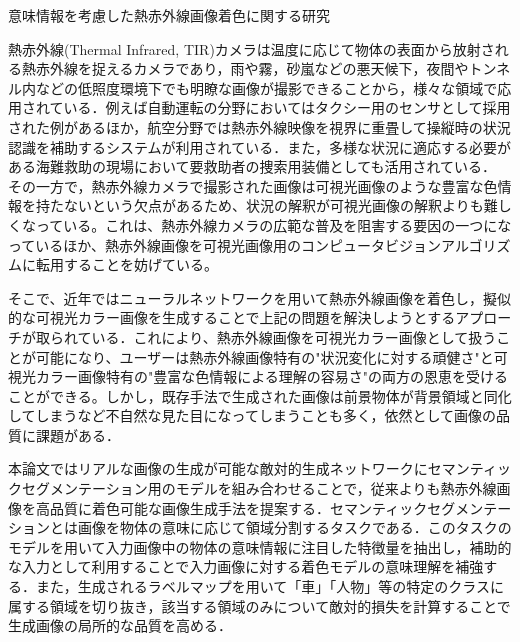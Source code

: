 \thispagestyle{empty}
\begin{center}
    意味情報を考慮した熱赤外線画像着色に関する研究
\end{center}

\thispagestyle{empty}
熱赤外線(Thermal Infrared, TIR)カメラは温度に応じて物体の表面から放射される熱赤外線を捉えるカメラであり，雨や霧，砂嵐などの悪天候下，夜間やトンネル内などの低照度環境下でも明瞭な画像が撮影できることから，様々な領域で応用されている．例えば自動運転の分野においてはタクシー用のセンサとして採用された例があるほか，航空分野では熱赤外線映像を視界に重畳して操縦時の状況認識を補助するシステムが利用されている．また，多様な状況に適応する必要がある海難救助の現場において要救助者の捜索用装備としても活用されている．
その一方で，熱赤外線カメラで撮影された画像は可視光画像のような豊富な色情報を持たないという欠点があるため、状況の解釈が可視光画像の解釈よりも難しくなっている。これは、熱赤外線カメラの広範な普及を阻害する要因の一つになっているほか、熱赤外線画像を可視光画像用のコンピュータビジョンアルゴリズムに転用することを妨げている。


そこで、近年ではニューラルネットワークを用いて熱赤外線画像を着色し，擬似的な可視光カラー画像を生成することで上記の問題を解決しようとするアプローチが取られている．これにより、熱赤外線画像を可視光カラー画像として扱うことが可能になり、ユーザーは熱赤外線画像特有の"状況変化に対する頑健さ"と可視光カラー画像特有の"豊富な色情報による理解の容易さ"の両方の恩恵を受けることができる。しかし，既存手法で生成された画像は前景物体が背景領域と同化してしまうなど不自然な見た目になってしまうことも多く，依然として画像の品質に課題がある．

本論文ではリアルな画像の生成が可能な敵対的生成ネットワークにセマンティックセグメンテーション用のモデルを組み合わせることで，従来よりも熱赤外線画像を高品質に着色可能な画像生成手法を提案する．セマンティックセグメンテーションとは画像を物体の意味に応じて領域分割するタスクである．このタスクのモデルを用いて入力画像中の物体の意味情報に注目した特徴量を抽出し，補助的な入力として利用することで入力画像に対する着色モデルの意味理解を補強する．また，生成されるラベルマップを用いて「車」「人物」等の特定のクラスに属する領域を切り抜き，該当する領域のみについて敵対的損失を計算することで生成画像の局所的な品質を高める．

